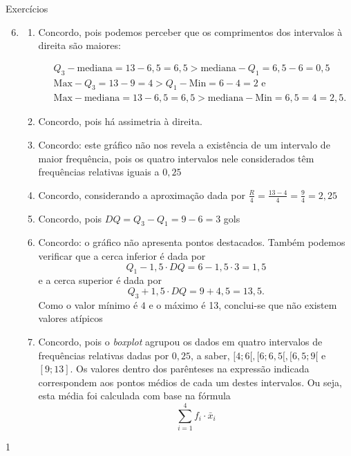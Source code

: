 \begin{answer}{Exercícios}
{\exerciselist
  \begin{enumerate}\setcounter{enumi}{5}
  \item 
  \begin{enumerate}
  \item Concordo, pois podemos perceber que os comprimentos dos intervalos à direita são maiores:

\resizebox{\linewidth}{!}
{
  \begin{minipage}{1.1\linewidth}
  \begin{align*}
  &Q_3-\text{mediana}=13-6{,}5=6{,}5>\text{mediana}-Q_1=6{,}5-6=0{,}5\\
  &\text{Max}-Q_3=13-9=4>Q_1-\text{Min}=6-4=2\text{ e}\\
  &\text{Max}-\text{mediana}=13-6{,}5=6{,}5>\text{mediana}-\text{Min}=6{,}5=4=2{,}5.
  \end{align*}
  \end{minipage}
}
   \item Concordo, pois há assimetria à direita.
  \item Concordo: este gráfico não nos revela a existência de um intervalo de maior frequência, pois os quatro intervalos nele considerados têm frequências relativas iguais a $0{,}25$
  \item Concordo, considerando a aproximação dada por $\frac{R}{4}=\frac{13-4}{4}=\frac{9}{4}=2{,}25$
  \item Concordo, pois $DQ=Q_3-Q_1=9-6=3$ gols
  \item Concordo: o gráfico não apresenta pontos destacados. Também podemos verificar que a cerca inferior é dada por
  \begin{equation*}
  Q_1-1{,}5\cdot DQ=6-1{,}5\cdot3=1{,}5
  \end{equation*}
  e a cerca superior é dada por
  \begin{equation*}
  Q_3+1{,}5\cdot DQ=9+4{,}5=13{,}5.
  \end{equation*}
  Como o valor mínimo é $4$ e o máximo é 13, conclui-se que não existem valores atípicos
  \item Concordo, pois o \textit{boxplot} agrupou os dados em quatro intervalos de frequências relativas dadas por $0{,}25$, a saber, $[4;6[,[6;6{,}5[,[6{,}5;9[$ e $[9;13]$. Os valores dentro dos parênteses na expressão indicada correspondem aos pontos médios de cada um destes intervalos. Ou seja, esta média foi calculada com base na fórmula
  \begin{equation*}
  \sum^4_{i=1}f_i\cdot\bar{x}_i
  \end{equation*}
  \end{enumerate}
  \end{enumerate}
}{1}
\end{answer}
